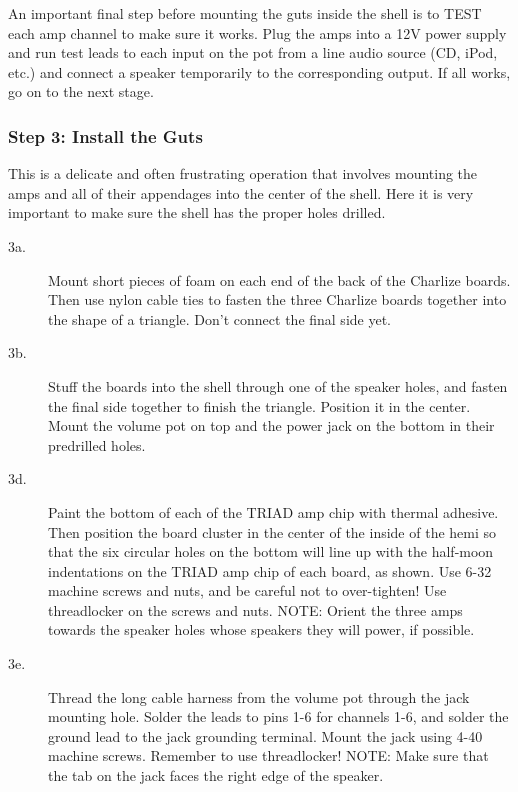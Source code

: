 An important final step before mounting the guts inside the shell is to TEST
each amp channel to make sure it works. Plug the amps into a 12V power supply and
run test leads to each input on the pot from a line audio source (CD, iPod, etc.)
and connect a speaker temporarily to the corresponding output. If all works, go
on to the next stage.

\subsubsection{Step 3: Install the Guts}

This is a delicate and often frustrating operation that involves mounting the
amps and all of their appendages into the center of the shell. Here it is very
important to make sure the shell has the proper holes drilled.

\begin{description}
	\item[3a.] Mount short pieces of foam on each end of the back of the Charlize boards.
Then use nylon cable ties to fasten the three Charlize boards together into the
shape of a triangle. Don't connect the final side yet.

	\item[3b.] Stuff the boards into the shell through one of the speaker holes, and
fasten the final side together to finish the triangle. Position it in the center.
Mount the volume pot on top and the power jack on the bottom in their predrilled
holes.

	\item[3d.] Paint the bottom of each of the TRIAD amp chip with thermal adhesive. Then
position the board cluster in the center of the inside of the hemi so that the
six circular holes on the bottom will line up with the half-moon indentations on
the TRIAD amp chip of each board, as shown. Use 6-32 machine screws and nuts, and
be careful not to over-tighten! Use threadlocker on the screws and nuts. NOTE:
Orient the three amps towards the speaker holes whose speakers they will power,
if possible.

	\item[3e.] Thread the long cable harness from the volume pot through the jack mounting
hole. Solder the leads to pins 1-6 for channels 1-6, and solder the ground lead
to the  jack grounding terminal. Mount the jack using 4-40 machine screws.
Remember to use threadlocker! NOTE: Make sure that the tab on the jack faces the
right edge of the speaker.
\end{description}

